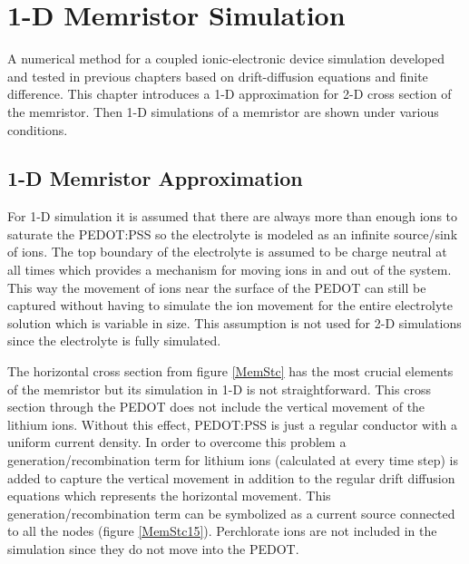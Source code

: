 \chapter{1-D Memristor Simulation} %

\label{Chapter6} %


\begin{doublespace}

A numerical method for a coupled ionic-electronic device simulation  developed and tested in previous chapters based on drift-diffusion equations and finite difference. This chapter introduces a 1-D approximation for  2-D cross section of the memristor. Then 1-D simulations of a memristor are shown under various conditions.
\section{1-D Memristor Approximation}

For  1-D simulation it is assumed that there are always more than enough ions to saturate the PEDOT:PSS so the electrolyte is modeled as an infinite source/sink of ions. The top boundary of the electrolyte is assumed to be charge neutral at all times which provides a mechanism for moving ions in and out of the system. This way the movement of ions near the surface of the PEDOT can still be captured without having to simulate the ion movement for the entire electrolyte solution which is variable in size. This assumption is not used for 2-D simulations since the electrolyte is fully simulated.
 
The horizontal cross section from figure \ref{MemStc} has the most crucial elements of the memristor but its simulation in 1-D is not straightforward. This cross section through the PEDOT does not include the vertical movement of the lithium ions. Without this effect, PEDOT:PSS is just a regular conductor with a uniform current density. In order to overcome this problem a generation/recombination term for lithium ions (calculated at every time step) is added to capture the vertical movement in addition to the regular drift diffusion equations which represents the horizontal movement. This generation/recombination term can be symbolized as a current source connected to all the nodes (figure \ref{MemStc15}). Perchlorate ions are not included in the simulation since they do not move into the PEDOT.


\end{doublespace}
